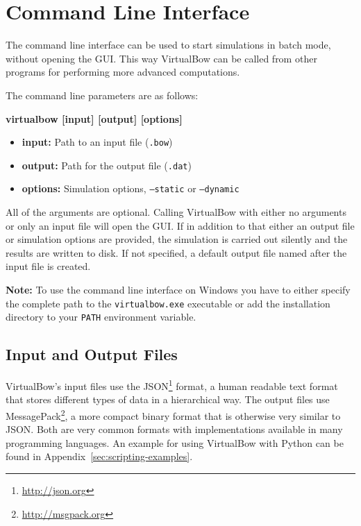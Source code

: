 \documentclass[12pt]{article}
\begin{document}
\newpage
\section{Command Line Interface}

The command line interface can be used to start simulations in batch mode, without opening the GUI.
This way VirtualBow can be called from other programs for performing more advanced computations.

The command line parameters are as follows:

\smallskip

\begin{framed}
\textbf{virtualbow [input] [output] [options]}
\end{framed}

\begin{itemize}
\item \textbf{input:} Path to an input file (\texttt{.bow})
\item \textbf{output:} Path for the output file (\texttt{.dat})
\item \textbf{options:} Simulation options, \texttt{--static} or \texttt{--dynamic}
\end{itemize}

\smallskip

All of the arguments are optional.
Calling VirtualBow with either no arguments or only an input file will open the GUI.
If in addition to that either an output file or simulation options are provided, the simulation is carried out silently and the results are written to disk.
If not specified, a default output file named after the input file is created.

\textbf{Note:} To use the command line interface on Windows you have to either specify the complete path to the \texttt{virtualbow.exe} executable or add the installation directory to your \texttt{PATH} environment variable.

\subsection*{Input and Output Files}

VirtualBow's input files use the JSON\footnote{\url{http://json.org}} format, a human readable text format that stores different types of data in a hierarchical way.
The output files use MessagePack\footnote{\url{http://msgpack.org}}, a more compact binary format that is otherwise very similar to JSON.
Both are very common formats with implementations available in many programming languages.
An example for using VirtualBow with Python can be found in Appendix~\ref{sec:scripting-examples}.
\end{document}
